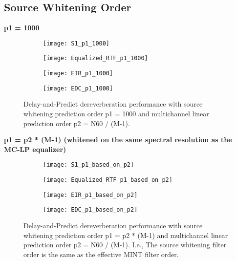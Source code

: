 \subsection{Source Whitening Order}

\textbf{p1 = 1000}

\begin{figure}[H]
	\centering
	\begin{subfigure}[b]{0.49\textwidth}
		\centering
		\texttt{[image: S1\_p1\_1000]}
	\end{subfigure}
	\hfill
	\begin{subfigure}[b]{0.49\textwidth}
		\centering
		\texttt{[image: Equalized\_RTF\_p1\_1000]}
	\end{subfigure}
	\hfill
	\begin{subfigure}[b]{0.49\textwidth}
		\centering
		\texttt{[image: EIR\_p1\_1000]}
	\end{subfigure}
	\hfill
	\begin{subfigure}[b]{0.49\textwidth}
		\centering
		\texttt{[image: EDC\_p1\_1000]}
	\end{subfigure}
	\hfill
	\caption{Delay-and-Predict dereverberation performance with source whitening prediction order p1 = 1000 and multichannel linear prediction order p2 = N60 / (M-1).}
	\label{fig:params_p1_1000}
\end{figure}

\textbf{p1 = p2 * (M-1) (whitened on the same spectral resolution as the MC-LP equalizer)}

\begin{figure}[H]
	\centering
	\begin{subfigure}[b]{0.49\textwidth}
		\centering
		\texttt{[image: S1\_p1\_based\_on\_p2]}
	\end{subfigure}
	\hfill
	\begin{subfigure}[b]{0.49\textwidth}
		\centering
		\texttt{[image: Equalized\_RTF\_p1\_based\_on\_p2]}
	\end{subfigure}
	\hfill
	\begin{subfigure}[b]{0.49\textwidth}
		\centering
		\texttt{[image: EIR\_p1\_based\_on\_p2]}
	\end{subfigure}
	\hfill
	\begin{subfigure}[b]{0.49\textwidth}
		\centering
		\texttt{[image: EDC\_p1\_based\_on\_p2]}
	\end{subfigure}
	\hfill
	\caption{Delay-and-Predict dereverberation performance with source whitening prediction order p1 = p2 * (M-1) and multichannel linear prediction order p2 = N60 / (M-1). I.e., The source whitening filter order is the same as the effective MINT filter order.}
	\label{fig:params_p1_based_on_p2}
\end{figure}

